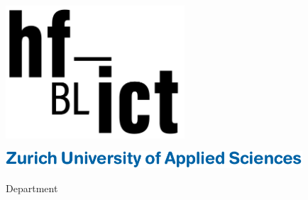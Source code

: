 

\begin{titlepage}

\setlength{\parskip}{0pt}

\begin{center}
\includegraphics[width=0.5\textwidth]{Bilder/hf-ict-Logo}

\ifxetex
    \vspace{0.6cm}
    {\zhawtitlefont\color{zhawblue}\LARGE \univname\par}   %
    \vspace{0.2cm}
\else
    \vspace{0.87cm}
    {\includegraphics[height=17.9pt]{Figures/zhaw_font_eng_font}\par}
    \vspace{0.05cm}
\fi
{\Large Department \deptname\par}                      %
\vspace{0.2cm}
{\Large \instname\par}                                 %
\vspace{3.5cm}                            
\textsc{\Large \ttype}                                 %
\vspace{0.2cm}
\HRule 
\vspace{0.4cm}
{\huge \bfseries \ttitle\par}                          %
\vspace{0.4cm}  
\HRule
\vspace{1.5cm}


\end{center}
\end{titlepage}
